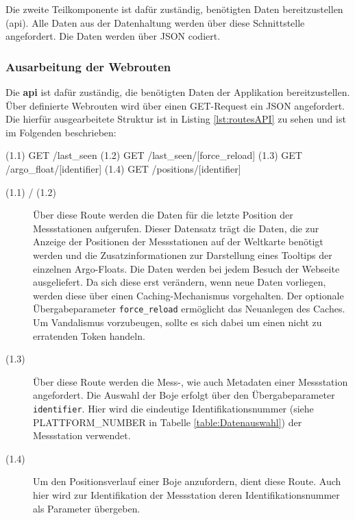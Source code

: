 Die zweite Teilkomponente ist dafür zuständig, benötigten Daten bereitzustellen (\gls{api}). Alle Daten aus der Datenhaltung werden über diese Schnittstelle angefordert. Die Daten werden über JSON codiert.


\subsubsection{Ausarbeitung der Webrouten} \label{sec:entwurfRoutes}


Die \textbf{\gls{api}} ist dafür zuständig, die benötigten Daten der Applikation bereitzustellen. Über definierte Webrouten wird über einen GET-Request ein JSON angefordert. Die  hierfür ausgearbeitete Struktur ist in Listing \ref{lst:routesAPI} zu sehen und ist im Folgenden beschrieben:

\begin{python}[label={lst:routesAPI}, caption={Webrouten der Datenrepresentation}]
(1.1) GET     /last_seen
(1.2) GET     /last_seen/[force_reload]
(1.3) GET     /argo_float/[identifier]
(1.4) GET     /positions/[identifier]
\end{python}

\begin{description}
 \item [(1.1) / (1.2)]
    Über diese Route  werden die Daten für die letzte Position der Messstationen aufgerufen. Dieser Datensatz trägt die Daten, die zur Anzeige der Positionen der Messstationen auf der Weltkarte benötigt werden und die Zusatzinformationen zur Darstellung eines Tooltips der einzelnen Argo-Floats. Die Daten werden bei jedem Besuch der Webseite ausgeliefert. Da sich diese erst verändern, wenn neue Daten vorliegen, werden diese über einen Caching-Mechanismus vorgehalten. Der optionale Übergabeparameter \texttt{force\_reload} ermöglicht das Neuanlegen des Caches. Um Vandalismus vorzubeugen, sollte es sich dabei um einen nicht zu  erratenden Token handeln.

 \item [(1.3)]
    Über diese Route werden die Mess-, wie auch Metadaten einer Messstation angefordert. Die Auswahl der Boje erfolgt über den Übergabeparameter \texttt{identifier}. Hier wird die eindeutige Identifikationsnummer  (siehe PLATTFORM\-\_NUMBER in Tabelle \ref{table:Datenauswahl}) der Messstation verwendet.

 \item [(1.4)]
    Um den Positionsverlauf einer Boje anzufordern, dient diese Route. Auch hier wird zur Identifikation der Messstation deren Identifikationsnummer als Parameter übergeben.
\end{description}



